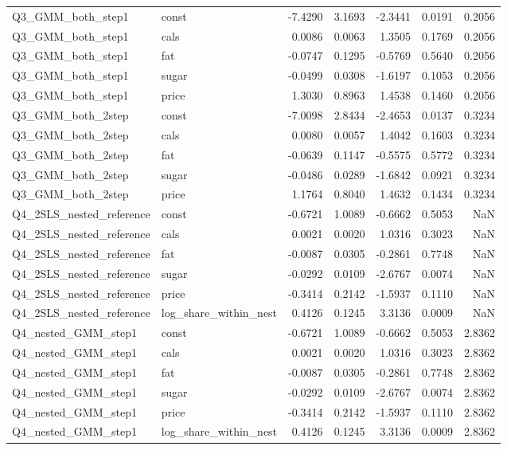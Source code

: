\begin{longtable}{llrrrrr}
Q3\_GMM\_both\_step1 & const & -7.4290 & 3.1693 & -2.3441 & 0.0191 & 0.2056 \\
Q3\_GMM\_both\_step1 & cals & 0.0086 & 0.0063 & 1.3505 & 0.1769 & 0.2056 \\
Q3\_GMM\_both\_step1 & fat & -0.0747 & 0.1295 & -0.5769 & 0.5640 & 0.2056 \\
Q3\_GMM\_both\_step1 & sugar & -0.0499 & 0.0308 & -1.6197 & 0.1053 & 0.2056 \\
Q3\_GMM\_both\_step1 & price & 1.3030 & 0.8963 & 1.4538 & 0.1460 & 0.2056 \\
Q3\_GMM\_both\_2step & const & -7.0098 & 2.8434 & -2.4653 & 0.0137 & 0.3234 \\
Q3\_GMM\_both\_2step & cals & 0.0080 & 0.0057 & 1.4042 & 0.1603 & 0.3234 \\
Q3\_GMM\_both\_2step & fat & -0.0639 & 0.1147 & -0.5575 & 0.5772 & 0.3234 \\
Q3\_GMM\_both\_2step & sugar & -0.0486 & 0.0289 & -1.6842 & 0.0921 & 0.3234 \\
Q3\_GMM\_both\_2step & price & 1.1764 & 0.8040 & 1.4632 & 0.1434 & 0.3234 \\
Q4\_2SLS\_nested\_reference & const & -0.6721 & 1.0089 & -0.6662 & 0.5053 & NaN \\
Q4\_2SLS\_nested\_reference & cals & 0.0021 & 0.0020 & 1.0316 & 0.3023 & NaN \\
Q4\_2SLS\_nested\_reference & fat & -0.0087 & 0.0305 & -0.2861 & 0.7748 & NaN \\
Q4\_2SLS\_nested\_reference & sugar & -0.0292 & 0.0109 & -2.6767 & 0.0074 & NaN \\
Q4\_2SLS\_nested\_reference & price & -0.3414 & 0.2142 & -1.5937 & 0.1110 & NaN \\
Q4\_2SLS\_nested\_reference & log\_share\_within\_nest & 0.4126 & 0.1245 & 3.3136 & 0.0009 & NaN \\
Q4\_nested\_GMM\_step1 & const & -0.6721 & 1.0089 & -0.6662 & 0.5053 & 2.8362 \\
Q4\_nested\_GMM\_step1 & cals & 0.0021 & 0.0020 & 1.0316 & 0.3023 & 2.8362 \\
Q4\_nested\_GMM\_step1 & fat & -0.0087 & 0.0305 & -0.2861 & 0.7748 & 2.8362 \\
Q4\_nested\_GMM\_step1 & sugar & -0.0292 & 0.0109 & -2.6767 & 0.0074 & 2.8362 \\
Q4\_nested\_GMM\_step1 & price & -0.3414 & 0.2142 & -1.5937 & 0.1110 & 2.8362 \\
Q4\_nested\_GMM\_step1 & log\_share\_within\_nest & 0.4126 & 0.1245 & 3.3136 & 0.0009 & 2.8362 \\

\end{longtable}
